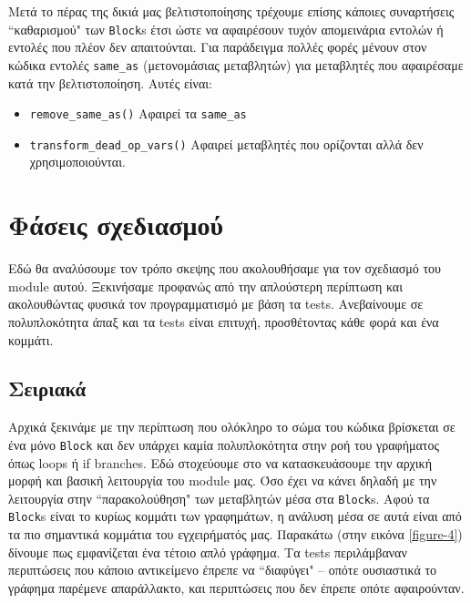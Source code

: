 Μετά το πέρας της δικιά μας βελτιστοποίησης τρέχουμε επίσης κάποιες συναρτήσεις
``καθαρισμού" των \texttt{Block}s έτσι ώστε να αφαιρέσουν τυχόν απομεινάρια
εντολών ή εντολές που πλέον δεν απαιτούνται. Για παράδειγμα πολλές φορές μένουν
στον κώδικα εντολές \texttt{same\_as} (μετονομάσιας μεταβλητών) για μεταβλητές
που αφαιρέσαμε κατά την βελτιστοποίηση. Αυτές είναι:

\begin{itemize}

\item \texttt{remove\_same\_as()} Αφαιρεί τα \texttt{same\_as}

\item \texttt{transform\_dead\_op\_vars()} Αφαιρεί μεταβλητές που ορίζονται αλλά
δεν χρησιμοποιούνται.

\end{itemize}


\section{Φάσεις σχεδιασμού}

Εδώ θα αναλύσουμε τον τρόπο σκεψης που ακολουθήσαμε για τον σχεδιασμό του module
αυτού. Ξεκινήσαμε προφανώς από την απλούστερη περίπτωση και ακολουθώντας φυσικά
τον προγραμματισμό με βάση τα tests. Ανεβαίνουμε σε πολυπλοκότητα άπαξ και τα
tests είναι επιτυχή, προσθέτοντας κάθε φορά και ένα κομμάτι.

\subsection{Σειριακά}

Αρχικά ξεκινάμε με την περίπτωση που ολόκληρο το σώμα του κώδικα βρίσκεται σε
ένα μόνο \texttt{Block} και δεν υπάρχει καμία πολυπλοκότητα στην ροή του
γραφήματος όπως loops ή if branches. Εδώ στοχεύουμε στο να κατασκευάσουμε την
αρχική μορφή και βασική λειτουργία του module μας. Όσο έχει να κάνει δηλαδή με
την λειτουργία στην ``παρακολούθηση" των μεταβλητών μέσα στα \texttt{Block}s.
Αφού τα \texttt{Block}s είναι το κυρίως κομμάτι των γραφημάτων, η ανάλυση μέσα
σε αυτά είναι από τα πιο σημαντικά κομμάτια του εγχειρήματός μας. Παρακάτω (στην
εικόνα \ref{figure-4}) δίνουμε πως εμφανίζεται ένα τέτοιο απλό γράφημα. Τα tests
περιλάμβαναν περιπτώσεις που κάποιο αντικείμενο έπρεπε να ``διαφύγει" – οπότε
ουσιαστικά το γράφημα παρέμενε απαράλλακτο, και περιπτώσεις που δεν έπρεπε οπότε
αφαιρούνταν.

